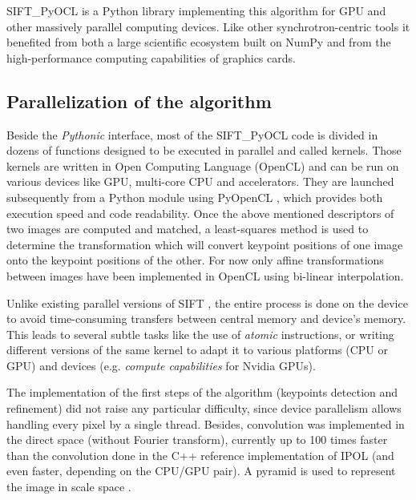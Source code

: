 \documentclass[preprint]{iucr}
\begin{document}
SIFT\_PyOCL is a Python library implementing this algorithm for GPU
and other massively parallel computing devices.
Like other synchrotron-centric tools \cite{pyhst2,pynx,pyfai} it benefited
from both a large scientific ecosystem built on NumPy \cite{numpy} and from
the high-performance computing capabilities of graphics cards.





\subsection{Parallelization of the algorithm}
Beside the \emph{Pythonic} interface, most of the
SIFT\_PyOCL code is divided in dozens of functions designed to be
executed in parallel and called kernels. Those kernels are written in Open
Computing Language (OpenCL) \cite{opencl} and  can be run on various
devices like GPU, multi-core CPU and accelerators.
They are launched subsequently from a Python module using PyOpenCL
\cite{pyopencl}, which provides both execution speed and code readability.
Once the above mentioned descriptors of two images are computed and matched, a
least-squares method is used to determine the transformation which will convert
keypoint positions of one image onto the keypoint positions of the other. For
now only affine transformations between images have been implemented in OpenCL
using bi-linear interpolation.

Unlike existing parallel versions of SIFT \cite{lu,rister,vasilyev}, the entire
process is done on the device to avoid time-consuming transfers between
central memory and device's memory.
This leads to several subtle tasks like the use of \emph{atomic} instructions,
or writing different versions of the same kernel to adapt it to various
platforms (CPU or GPU) and devices (e.g. \emph{compute capabilities} for
Nvidia GPUs).

The implementation of the first steps of the algorithm (keypoints detection and
refinement) did not raise any particular difficulty, since device parallelism
allows handling every pixel by a single thread.
Besides, convolution was implemented in the direct space (without Fourier
transform), currently up to 100 times faster than the convolution done in
the C++ reference implementation of IPOL \cite{ASIFT}
(and even faster, depending on the CPU/GPU pair).
A pyramid is used to represent the image in scale space \cite{Lowe04}.
\end{document}
